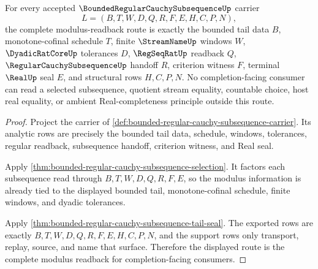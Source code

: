 \begin{theorem}
\label{thm:regular-cauchy-subsequence-modulus-readback}
For every accepted $\BoundedRegularCauchySubsequenceUp$ carrier
$$
L=(B,T,W,D,Q,R,F,E,H,C,P,N),
$$
the complete modulus-readback route is exactly the bounded tail data $B$, monotone-cofinal schedule $T$, finite $\StreamNameUp$ windows $W$, $\DyadicRatCoreUp$ tolerances $D$, $\RegSeqRatUp$ readback $Q$, $\RegularCauchySubsequenceUp$ handoff $R$, criterion witness $F$, terminal $\RealUp$ seal $E$, and structural rows $H,C,P,N$. No completion-facing consumer can read a selected subsequence, quotient stream equality, countable choice, host real equality, or ambient Real-completeness principle outside this route.
\end{theorem}
\begin{proof}
Project the carrier of \autoref{def:bounded-regular-cauchy-subsequence-carrier}. Its analytic rows are precisely the bounded tail data, schedule, windows, tolerances, regular readback, subsequence handoff, criterion witness, and Real seal.

Apply \autoref{thm:bounded-regular-cauchy-subsequence-selection}. It factors each subsequence read through $B,T,W,D,Q,R,F,E$, so the modulus information is already tied to the displayed bounded tail, monotone-cofinal schedule, finite windows, and dyadic tolerances.

Apply \autoref{thm:bounded-regular-cauchy-subsequence-tail-seal}. The exported rows are exactly $B,T,W,D,Q,R,F,E,H,C,P,N$, and the support rows only transport, replay, source, and name that surface. Therefore the displayed route is the complete modulus readback for completion-facing consumers.
\end{proof}

